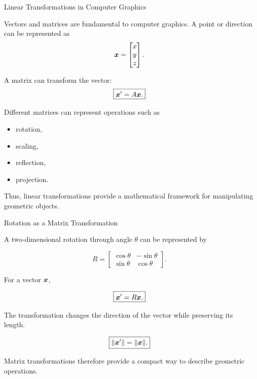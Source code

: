 
\begin{frame}{Linear Transformations in Computer Graphics}

Vectors and matrices are fundamental to computer graphics.
\vspace{-0.1cm}
A point or direction can be represented as
\vspace{-0.1cm}
\[
\bm{x}
=
\begin{bmatrix}
x\\y\\z
\end{bmatrix}.
\]

A matrix can transform the vector:
\vspace{-0.1cm}
\[
\boxed{
\bm{x}'=A\bm{x}.
}
\]

Different matrices can represent operations such as

\begin{itemize}
    \item rotation,
    \item scaling,
    \item reflection,
    \item projection.
\end{itemize}

Thus, linear transformations provide a mathematical
framework for manipulating geometric objects.

\end{frame}



\begin{frame}{Rotation as a Matrix Transformation}

A two-dimensional rotation through angle $\theta$ can be
represented by

\[
\boxed{
R=
\begin{bmatrix}
\cos\theta&-\sin\theta\\
\sin\theta&\cos\theta
\end{bmatrix}.
}
\]

For a vector $\bm{x}$,

\[
\boxed{
\bm{x}'=R\bm{x}.
}
\]

The transformation changes the direction of the vector
while preserving its length.

\[
\boxed{
\|\bm{x}'\|=\|\bm{x}\|.
}
\]

Matrix transformations therefore provide a compact way
to describe geometric operations.

\end{frame}


